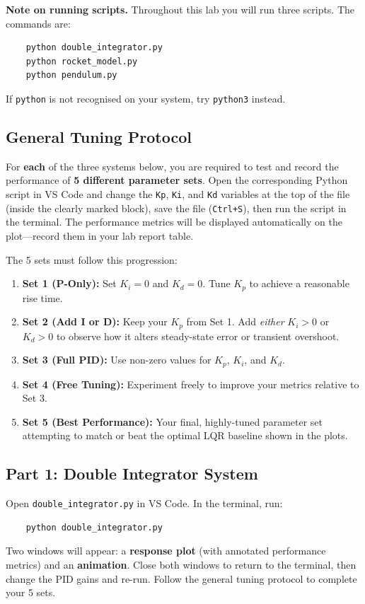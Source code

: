 \documentclass[12pt]{article}
\begin{document}
\textbf{Note on running scripts.}  Throughout this lab you will run three scripts.  The commands are:
\begin{verbatim}
    python double_integrator.py
    python rocket_model.py
    python pendulum.py
\end{verbatim}
If \texttt{python} is not recognised on your system, try \texttt{python3} instead.

\subsection{General Tuning Protocol}
For \textbf{each} of the three systems below, you are required to test and record the performance of \textbf{5 different parameter sets}. Open the corresponding Python script in VS Code and change the \texttt{Kp}, \texttt{Ki}, and \texttt{Kd} variables at the top of the file (inside the clearly marked block), save the file (\texttt{Ctrl+S}), then run the script in the terminal.  The performance metrics will be displayed automatically on the plot---record them in your lab report table.

The 5 sets must follow this progression:
\begin{enumerate}
    \item \textbf{Set 1 (P-Only):} Set $K_i = 0$ and $K_d = 0$. Tune $K_p$ to achieve a reasonable rise time.
    \item \textbf{Set 2 (Add I or D):} Keep your $K_p$ from Set 1. Add \textit{either} $K_i > 0$ or $K_d > 0$ to observe how it alters steady-state error or transient overshoot. 
    \item \textbf{Set 3 (Full PID):} Use non-zero values for $K_p$, $K_i$, and $K_d$.
    \item \textbf{Set 4 (Free Tuning):} Experiment freely to improve your metrics relative to Set 3.
    \item \textbf{Set 5 (Best Performance):} Your final, highly-tuned parameter set attempting to match or beat the optimal LQR baseline shown in the plots.
\end{enumerate}

\subsection{Part 1: Double Integrator System}
Open \texttt{double\_integrator.py} in VS Code.  In the terminal, run:
\begin{verbatim}
    python double_integrator.py
\end{verbatim}
Two windows will appear: a \textbf{response plot} (with annotated performance metrics) and an \textbf{animation}.  Close both windows to return to the terminal, then change the PID gains and re-run.  Follow the general tuning protocol to complete your 5 sets. 
\end{document}
